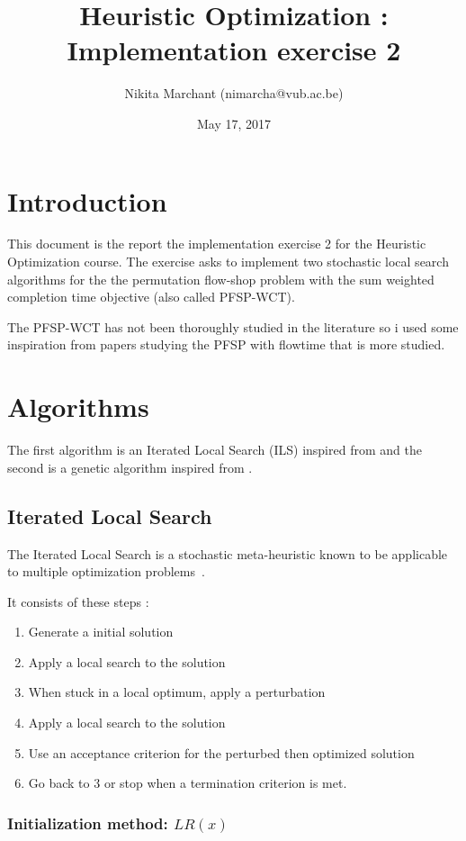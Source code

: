\documentclass[a4paper]{article}
\title{Heuristic Optimization : Implementation exercise 2}
\date{May 17, 2017}
\author{Nikita Marchant (nimarcha@vub.ac.be)}
\begin{document}
\maketitle

\section{Introduction}

This document is the report the implementation exercise 2 for the Heuristic Optimization course.
The exercise asks to implement two stochastic local search algorithms for the the permutation flow-shop problem with the sum weighted completion time objective (also called PFSP-WCT).

The PFSP-WCT has not been thoroughly studied in the literature so i used some inspiration from papers studying the PFSP with flowtime that is more studied.

\section{Algorithms}

The first algorithm is an Iterated Local Search (ILS) inspired from \cite{panruiz2012} and the second is a genetic algorithm inspired from \cite{zhang2009}.

\subsection{Iterated Local Search}

The Iterated Local Search is a stochastic meta-heuristic
known to be applicable to multiple optimization problems~\cite{Lourenco2010}.

It consists of these steps :

\begin{enumerate}
    \item Generate a initial solution
    \item Apply a local search to the solution
    \item When stuck in a local optimum, apply a perturbation
    \item Apply a local search to the solution
    \item Use an acceptance criterion for the perturbed then optimized solution
    \item Go back to 3 or stop when a termination criterion is met.
\end{enumerate}

\subsubsection{Initialization method: $LR(x)$}
\label{LR}
\end{document}
